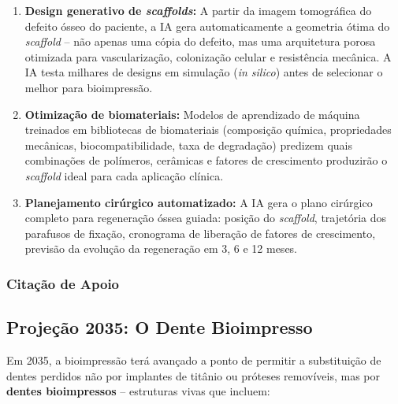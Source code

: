 \begin{enumerate}
  \item \textbf{Design generativo de \textit{scaffolds}:} A partir da imagem
    tomográfica do defeito ósseo do paciente, a IA gera automaticamente a
    geometria ótima do \textit{scaffold} -- não apenas uma cópia do defeito,
    mas uma arquitetura porosa otimizada para vascularização, colonização
    celular e resistência mecânica. A IA testa milhares de designs em
    simulação (\textit{in silico}) antes de selecionar o melhor para
    bioimpressão.

  \item \textbf{Otimização de biomateriais:} Modelos de aprendizado de máquina
    treinados em bibliotecas de biomateriais (composição química, propriedades
    mecânicas, biocompatibilidade, taxa de degradação) predizem quais
    combinações de polímeros, cerâmicas e fatores de crescimento produzirão o
    \textit{scaffold} ideal para cada aplicação clínica.

  \item \textbf{Planejamento cirúrgico automatizado:} A IA gera o plano
    cirúrgico completo para regeneração óssea guiada: posição do \textit{
    scaffold}, trajetória dos parafusos de fixação, cronograma de liberação de
    fatores de crescimento, previsão da evolução da regeneração em 3, 6 e 12
    meses.
\end{enumerate}

\subsubsection{Citação de Apoio}


\subsection{Projeção 2035: O Dente Bioimpresso}

Em 2035, a bioimpressão terá avançado a ponto de permitir a substituição de
dentes perdidos não por implantes de titânio ou próteses removíveis, mas por
\textbf{dentes bioimpressos} -- estruturas vivas que incluem:

